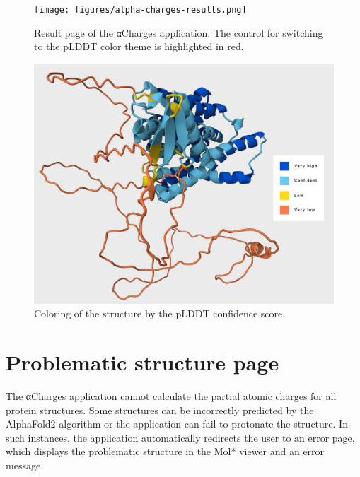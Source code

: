 \documentclass[
  digital,     %
  oneside,     %
  nosansbold,  %
  nocolorbold, %
  lof,         %
  lot,         %
]{fithesis4}
\begin{document}
\begin{figure}[htbp]
  \begin{center}
    \texttt{[image: figures/alpha-charges-results.png]}
  \end{center}
  \caption[Result page of the αCharges application.]{Result page of the αCharges application. The control for switching to the pLDDT color theme is highlighted in red.}
  \label{fig:alpha-charges-results}
\end{figure}

\begin{figure}[htbp]
  \begin{center}
    \includegraphics[width=\textwidth]{figures/alphafold_coloring.png}
  \end{center}
  \caption{Coloring of the structure by the pLDDT confidence score.}
  \label{fig:alphafold-coloring}
\end{figure}

\section{Problematic structure page}

The αCharges application cannot calculate the partial atomic charges for all protein structures. Some structures can be incorrectly predicted by the AlphaFold2 algorithm or the application can fail to protonate the structure.
\cite{jumper2021alphafold} In such instances, the application automatically redirects the user to an error page, which displays the problematic structure in the Mol* viewer and an error message.
\end{document}
